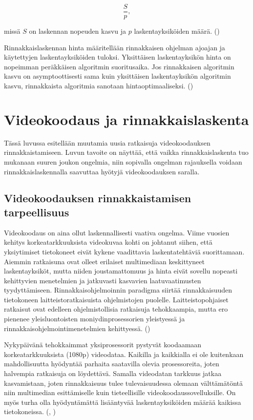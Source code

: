 \begin{center}
\begin{equation}\frac{S}{p},\end{equation}
\end{center}

missä $S$ on laskennan nopeuden kasvu ja $p$ laskentayksiköiden määrä. 
(\citealt{intro})

Rinnakkaislaskennan hinta määritellään rinnakkaisen ohjelman ajoajan ja
käytettyjen laskentayksiköiden tuloksi. Yksittäisen laskentayksikön hinta on
nopeimman peräkkäisen algoritmin suoritusaika. Jos rinnakkaisen algoritmin
kasvu on asymptoottisesti sama kuin yksittäisen laskentayksikön algoritmin kasvu,
rinnakkaista algoritmia sanotaan hintaoptimaaliseksi. (\citealt{intro})

\section{Videokoodaus ja rinnakkaislaskenta}

Tässä luvussa esitellään muutamia uusia ratkaisuja videokoodauksen
rinnakkaistamiseen. Luvun tavoite on näyttää, että vaikka rinnakkaislaskenta
tuo mukanaan suuren joukon ongelmia, niin sopivalla ongelman rajauksella
voidaan rinnakkaislaskennalla saavuttaa hyötyjä videokoodauksen saralla.

\subsection{Videokoodauksen rinnakkaistamisen tarpeellisuus}

Videokoodaus on aina ollut laskennallisesti vaativa ongelma. Viime vuosien
kehitys korkeatarkkuuksista videokuvaa kohti on johtanut siihen, että
yksiytimiset tietokoneet eivät kykene vaadittavia laskentatehtäviä suorittamaan.
Aiemmin ratkaisuna ovat olleet erilaiset multimediaan keskittyneet
laskentayksiköt, mutta niiden joustamattomuus ja hinta eivät sovellu nopeasti
kehittyvien menetelmien ja jatkuvasti kasvavien laatuvaatimusten tyydyttämiseen.
Rinnakkaisohjelmoinnin paradigma siirtää rinnakkaisuuden tietokoneen
laitteistoratkaisuista ohjelmistojen puolelle. Laitteistopohjaiset ratkaisut
ovat edelleen ohjelmistollisia ratkaisuja tehokkaampia, mutta ero pienenee
yleisluontoisten moniydinprosessorien yleistyessä ja
rinnakkaisohjelmointimenetelmien kehittyessä. (\citealt{choi})

Nykypäivänä tehokkaimmat yksiprosessorit pystyvät koodaamaan
korkeatarkkuuksista (1080p) videodataa. Kaikilla ja kaikkialla ei ole
kuitenkaan mahdollisuutta hyödyntää parhaita saatavilla olevia prosessoreita,
joten halvempia ratkaisuja on löydettävä. Samalla videodatan tarkkuus jatkaa
kasvamistaan, joten rinnakkaisuus tulee tulevaisuudessa olemaan välttämätöntä
niin multimedian esittämiselle kuin tieteellisille videokoodaussovelluksille.
On myös turha olla hyödyntämättä lisääntyvää laskentayksiköiden määrää kaikissa
tietokoneissa. (\citealt{chi}, \citealt{xu})

